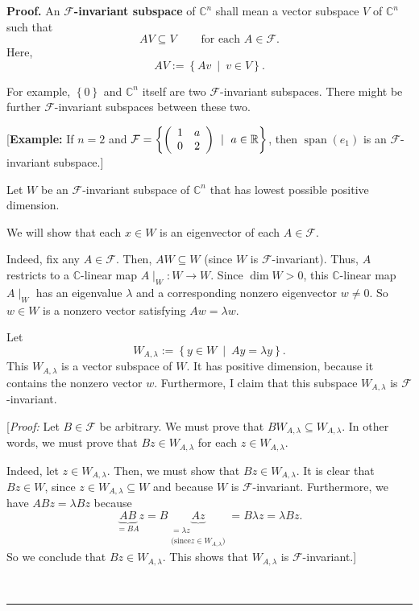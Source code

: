 \documentclass[numbers=enddot,12pt,final,onecolumn,notitlepage]{scrartcl}%
\numberwithin{exer}{subsection}
\theoremstyle{definition}
\newenvironment{proof}[1][Proof]{\noindent\textbf{#1.} }{\ \rule{0.5em}{0.5em}}
\begin{document}
\begin{proof}
An $\mathcal{F}$\textbf{-invariant subspace} of $\mathbb{C}^{n}$ shall mean a
vector subspace $V$ of $\mathbb{C}^{n}$ such that%
\[
AV\subseteq V\ \ \ \ \ \ \ \ \ \ \text{for each }A\in\mathcal{F}.
\]
Here,%
\[
AV:=\left\{  Av\ \mid\ v\in V\right\}  .
\]


For example, $\left\{  0\right\}  $ and $\mathbb{C}^{n}$ itself are two
$\mathcal{F}$-invariant subspaces. There might be further $\mathcal{F}%
$-invariant subspaces between these two.

[\textbf{Example:} If $n=2$ and $\mathcal{F}=\left\{  \left(
\begin{array}
[c]{cc}%
1 & a\\
0 & 2
\end{array}
\right)  \ \mid\ a\in\mathbb{R}\right\}  $, then $\operatorname*{span}\left(
e_{1}\right)  $ is an $\mathcal{F}$-invariant subspace.]

Let $W$ be an $\mathcal{F}$-invariant subspace of $\mathbb{C}^{n}$ that has
lowest possible positive dimension.

We will show that each $x\in W$ is an eigenvector of each $A\in\mathcal{F}$.

Indeed, fix any $A\in\mathcal{F}$. Then, $AW\subseteq W$ (since $W$ is
$\mathcal{F}$-invariant). Thus, $A$ restricts to a $\mathbb{C}$-linear map
$A\mid_{W}:W\rightarrow W$. Since $\dim W>0$, this $\mathbb{C}$-linear map
$A\mid_{W}$ has an eigenvalue $\lambda$ and a corresponding nonzero
eigenvector $w\neq0$. So $w\in W$ is a nonzero vector satisfying $Aw=\lambda
w$.

Let%
\[
W_{A,\lambda}:=\left\{  y\in W\ \mid\ Ay=\lambda y\right\}  .
\]
This $W_{A,\lambda}$ is a vector subspace of $W$. It has positive dimension,
because it contains the nonzero vector $w$. Furthermore, I claim that this
subspace $W_{A,\lambda}$ is $\mathcal{F}$-invariant.

[\textit{Proof:} Let $B\in\mathcal{F}$ be arbitrary. We must prove that
$BW_{A,\lambda}\subseteq W_{A,\lambda}$. In other words, we must prove that
$Bz\in W_{A,\lambda}$ for each $z\in W_{A,\lambda}$.

Indeed, let $z\in W_{A,\lambda}$. Then, we must show that $Bz\in W_{A,\lambda
}$. It is clear that $Bz\in W$, since $z\in W_{A,\lambda}\subseteq W$ and
because $W$ is $\mathcal{F}$-invariant. Furthermore, we have $ABz=\lambda Bz$
because%
\[
\underbrace{AB}_{=BA}z=B\underbrace{Az}_{\substack{=\lambda z\\\text{(since
}z\in W_{A,\lambda}\text{)}}}=B\lambda z=\lambda Bz.
\]
So we conclude that $Bz\in W_{A,\lambda}$. This shows that $W_{A,\lambda}$ is
$\mathcal{F}$-invariant.]


\end{proof}
\end{document}

